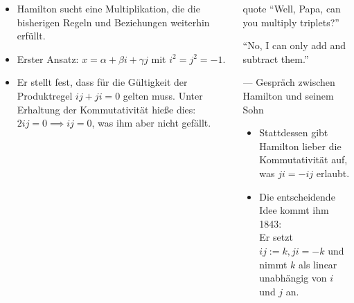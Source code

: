 \documentclass[aspectratio=169]{beamer}
\begin{document}
    \begin{frame}
    \begin{columns}
    \begin{column}{0.5\textwidth}
        \begin{itemize}
            \item<1->
                Hamilton sucht eine Multiplikation, die die bisherigen Regeln und Beziehungen weiterhin erfüllt.

            \item<2->
                Erster Ansatz: \(x = \alpha + \beta i + \gamma j\) mit \(i^2 = j^2 = -1\).

            \item<3->
                Er stellt fest, dass für die Gültigkeit der Produktregel \(ij + ji = 0\) gelten muss.
                Unter Erhaltung der Kommutativität hieße dies: \(2ij = 0 \implies ij = 0\), was ihm aber nicht gefällt.
        \end{itemize}
    \end{column}
    \begin{column}{0.5\textwidth}
        \begin{beamercolorbox}[wd=\textwidth, rounded=true, shadow=true]{quote}
            \enquote{Well, Papa, can you multiply triplets?}

            \enquote{No, I can only add and subtract them.}

            \vspace{2mm}
            \hfill {\scriptsize--- Gespräch zwischen Hamilton und seinem Sohn}
        \end{beamercolorbox}

        \begin{itemize}
            \item<4->
                Stattdessen gibt Hamilton lieber die Kommutativität auf, was \(ji = -ij\) erlaubt.

            \item<5->
                Die entscheidende Idee kommt ihm 1843:\\
                Er setzt \(ij := k, ji = -k\) und nimmt  \(k\) als linear unabhängig von \(i\) und \(j\) an.
        \end{itemize}
        \vfill
    \end{column}
    \end{columns}
    \end{frame}
\end{document}
